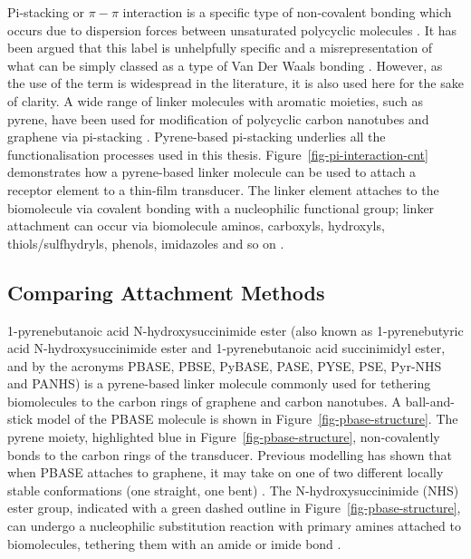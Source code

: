 \documentclass[
  a4paper,
]{scrbook}
\begin{document}
Pi-stacking or \(\pi-\pi\) interaction is a specific type of
non-covalent bonding which occurs due to dispersion forces between
unsaturated polycyclic molecules \autocite{Perez2015}. It has been
argued that this label is unhelpfully specific and a misrepresentation
of what can be simply classed as a type of Van Der Waals bonding
\autocite{Martinez2012,Perez2015}. However, as the use of the term is
widespread in the literature, it is also used here for the sake of
clarity. A wide range of linker molecules with aromatic moieties, such
as pyrene, have been used for modification of polycyclic carbon
nanotubes and graphene via pi-stacking
\autocite{Hermanson2013-16,Perez2015,Zhou2019,Mishyn2022}. Pyrene-based
pi-stacking underlies all the functionalisation processes used in this
thesis. Figure~\ref{fig-pi-interaction-cnt} demonstrates how a
pyrene-based linker molecule can be used to attach a receptor element to
a thin-film transducer. The linker element attaches to the biomolecule
via covalent bonding with a nucleophilic functional group; linker
attachment can occur via biomolecule aminos, carboxyls, hydroxyls,
thiols/sulfhydryls, phenols, imidazoles and so on
\autocite{Fruh2011,Dung2018}.

\hypertarget{sec-PBASE-attachment}{%
\subsection{Comparing Attachment Methods}\label{sec-PBASE-attachment}}

1-pyrenebutanoic acid N-hydroxysuccinimide ester (also known as
1-pyrenebutyric acid N-hydroxysuccinimide ester and 1-pyrenebutanoic
acid succinimidyl ester, and by the acronyms PBASE, PBSE, PyBASE, PASE,
PYSE, PSE, Pyr-NHS and PANHS) is a pyrene-based linker molecule commonly
used for tethering biomolecules to the carbon rings of graphene and
carbon nanotubes. A ball-and-stick model of the PBASE molecule is shown
in Figure~\ref{fig-pbase-structure}. The pyrene moiety, highlighted blue
in Figure~\ref{fig-pbase-structure}, non-covalently bonds to the carbon
rings of the transducer. Previous modelling has shown that when PBASE
attaches to graphene, it may take on one of two different locally stable
conformations (one straight, one bent) \autocite{Oishi2022}. The
N-hydroxysuccinimide (NHS) ester group, indicated with a green dashed
outline in Figure~\ref{fig-pbase-structure}, can undergo a nucleophilic
substitution reaction with primary amines attached to biomolecules,
tethering them with an amide or imide bond
\autocite{Chen2001,Hermanson2013-16,Hermanson2013-3,Shkodra2021,Mishyn2022}.
\end{document}
